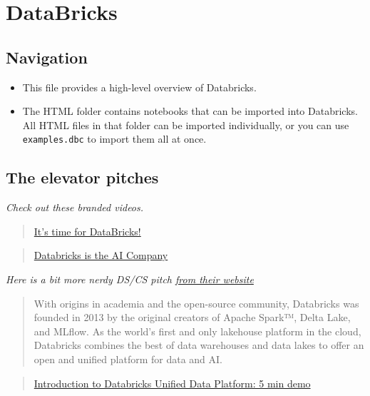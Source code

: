 \documentclass[
  letterpaper,
  DIV=11,
  numbers=noendperiod]{scrreprt}
\providecommand{\tightlist}{%
  \setlength{\itemsep}{0pt}\setlength{\parskip}{0pt}}\usepackage{longtable,booktabs,array}
\begin{document}
\hypertarget{databricks}{%
\section{DataBricks}\label{databricks}}

\hypertarget{navigation}{%
\subsection{Navigation}\label{navigation}}

\begin{itemize}
\tightlist
\item
  This file provides a high-level overview of Databricks.
\item
  The HTML folder contains notebooks that can be imported into
  Databricks. All HTML files in that folder can be imported
  individually, or you can use \texttt{examples.dbc} to import them all
  at once.
\end{itemize}

\hypertarget{the-elevator-pitches}{%
\subsection{The elevator pitches}\label{the-elevator-pitches}}

\emph{Check out these branded videos.}

\begin{quote}
\href{https://youtu.be/_1QQHv7T9og}{It's time for DataBricks!}
\end{quote}

\begin{quote}
\href{https://youtu.be/1cJ0XYaARBY}{Databricks is the AI Company}
\end{quote}

\emph{Here is a bit more nerdy DS/CS pitch
\href{https://databricks.com/company/about-us}{from their website}}

\begin{quote}
With origins in academia and the open-source community, Databricks was
founded in 2013 by the original creators of Apache Spark™, Delta Lake,
and MLflow. As the world's first and only lakehouse platform in the
cloud, Databricks combines the best of data warehouses and data lakes to
offer an open and unified platform for data and AI.
\end{quote}

\begin{quote}
\href{https://youtu.be/n-yt_3HvkOI}{Introduction to Databricks Unified
Data Platform: 5 min demo}
\end{quote}
\end{document}
